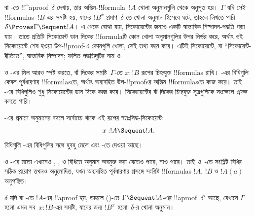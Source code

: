 \documentclass[../../../include/open-logic-section]{subfiles}
\begin{document}


 বা -তে !!^a{proof}~$\delta$
দেখায়, তার অন্তিম-!!{formula}~$!A$ খোলা অনুমানগুলি
থেকে অনুসৃত হয়। $\Gamma$ যদি সেই !!{formula}s~$!B$-এর
সমষ্টি হয়, যাদের $!B^x$ প্রমাণ~$\delta$-তে খোলা
অনুমান হিসেবে ঘটে, তাহলে লিখতে পারি
$\delta \Proves \Gamma \Sequent !A$। এ থেকে
বোঝা যায়, সিকোয়েন্টের জন্যও একটি স্বাভাবিক
নিষ্পাদন-পদ্ধতি গড়া যায়। তাতে প্রতিটি সিকোয়েন্ট
ডান দিকের !!{formula}টি কোন খোলা অনুমানগুলির উপর
নির্ভর করে, অর্থাৎ ওই সিকোয়েন্টে শেষ হওয়া
উপ-!!{proof}-এ কোনগুলি খোলা, সেই তথ্য বহন করে।
এটিই সিকোয়েন্টে, বা “সিকোয়েন্ট-রীতিতে”,
স্বাভাবিক নিষ্পাদন; ফলিত পদ্ধতিদুটির নাম
 ও~।

 ও -এর মিল আরও স্পষ্ট করতে,
বাঁ দিকের সমষ্টি~$\Gamma$-তে $x:!B$ রূপের
চিহ্নযুক্ত !!{formula}s রাখি। -এর
বিধিগুলি কেবল পূর্বধারণার !!{formula}sতে,
অর্থাৎ অব্যবহিত উপ-!!{proof}sর অন্তিম
!!{formula}sতে কাজ করে। তাই -এর
বিধিগুলিও শুধু সিকোয়েন্টের ডান দিকে কাজ করে।
সিকোয়েন্টের বাঁ দিকের চিহ্নযুক্ত সূত্রগুলিকে
সংক্ষেপে \emph{প্রসঙ্গ} বলতে পারি।

-এর প্রমাণে অনুমানের বদলে সর্বোচ্চে
থাকে এই রূপের স্বতঃসিদ্ধ-সিকোয়েন্ট:
\[x:!A \Sequent !A.\]
বিধিগুলি -এর বিধিগুলির সঙ্গে হুবহু
মেলে এবং -তে দেওয়া আছে।



 ও -এর মতো এখানেও
\Intro{\lif}, \Intro{\lnot}, \Elim{\lor}
ও \Elim{\lexists} বিধিতে অনুমান অবমুক্ত করা
যেতেও পারে, নাও পারে। তাই 
ও~-তে সংশ্লিষ্ট বিধির সঠিক প্রয়োগ
তখনও অনুমোদিত, যখন অব্যবহিত পূর্বধারণার
প্রসঙ্গে সংশ্লিষ্ট !!{formula}s $!A$, $!B$
ও $!A(a)$ অনুপস্থিত।

\begin{prop}
$\delta$ যদি  বা -তে
$!A$-এর !!a{proof} হয়, তাহলে 
()-তে $\Gamma \Sequent !A$-এর
!!a{proof}~$\delta'$ আছে, যেখানে $\Gamma$
হলো এমন সব~$x:!B$-এর সমষ্টি, যাদের জন্য
$!B^x$ হলো~$\delta$-র খোলা অনুমান।
\end{prop}
\end{document}
